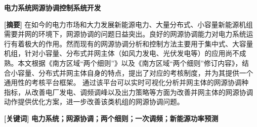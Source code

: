 \songti
\begin{center}
  \textbf{电力系统网源协调控制系统开发}
\end{center}
\vspace{0.5cm}\noindent\textbf{[摘要]\quad}
在如今的电力市场和大力发展新能源电力、大量分布式、小容量新能源机组需要并网的环境下，网源协调的问题日益突出。良好的网源协调能力对电力系统运行有着极大的作用。然而现有的网源协调分析和控制方法主要用于集中式、大容量机组，针对小容量、分布式并网主体（如风力发电、光伏发电等）的应用尚不成熟。本文根据《南方区域“两个细则”》以及《南方区域“两个细则”修订内容》，结合小容量、分布式并网主体自身的特点，提出了对应的考核制度，并为其提供一个通用性的考核平台框架。
通过该平台可以实时可视化分析并网主体的网源协调种指标，从改善电厂发电、调频调峰以及出力策略等方面为改善并网主体的网源协调动作提供优化方案，进一步改善该类机组的网源协调问题。

%
\par\vspace{1cm}\noindent\textbf{[关键词]\quad}
\textbf{电力系统；网源协调；两个细则；一次调频；新能源功率预测}
\newpage


